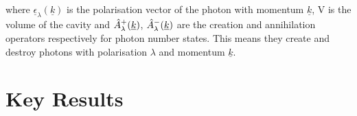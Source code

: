 \noindent where $\underline{\epsilon}_\lambda(\underline{k})$ is the polarisation vector of the photon with momentum $\underline{k}$, V is the volume of the cavity and $\Hat{A}^+_\lambda(\underline{k})$, $\Hat{A}^-_\lambda(\underline{k})$ are the creation and annihilation operators respectively for photon number states. This means they create and destroy photons with polarisation $\lambda$ and momentum $\underline{k}$.

\section{Key Results}

